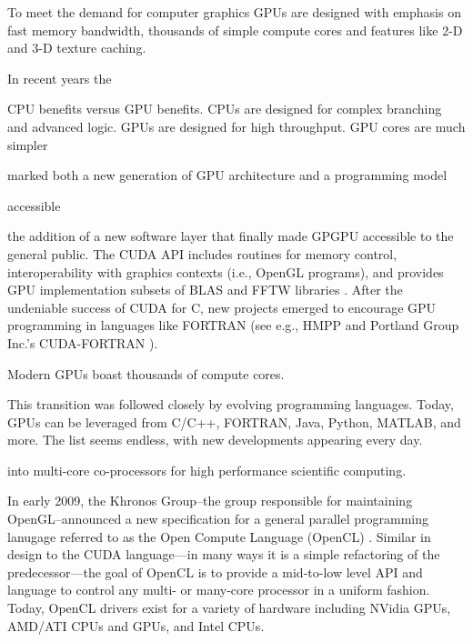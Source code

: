 \documentclass{report}
\begin{document}
To meet the demand for computer graphics GPUs are designed with emphasis on fast memory bandwidth, thousands of simple compute cores and features like 2-D and 3-D texture caching. 



In recent years the 

CPU benefits versus GPU benefits. CPUs are designed for complex branching and advanced logic. GPUs are designed for high throughput. GPU cores are much simpler 



 

marked both a 
new generation of GPU architecture and a programming model 

accessible 


the addition of a new software layer that finally made GPGPU accessible to the general public. The CUDA API includes routines for memory control, interoperability with graphics contexts (i.e., 
OpenGL programs), and provides GPU implementation subsets of BLAS and FFTW libraries \cite{CudaGuide2011}. After the undeniable success of CUDA for C, new projects emerged to encourage GPU programming in languages like FORTRAN (see e.g., HMPP \cite{HMPP2009} and Portland Group Inc.'s CUDA-FORTRAN \cite{CudaFortran2009}). 


Modern GPUs boast thousands of compute cores. 


This transition was 
followed closely by evolving programming languages. Today, GPUs can be leveraged from C/C++, FORTRAN, Java, Python, MATLAB, and more. The list seems endless, with new developments appearing every day. 

 into multi-core co-processors for high performance scientific computing.

In early 2009, the Khronos Group--the group responsible for maintaining OpenGL--announced a new specification for a general 
parallel programming lanugage referred to as the Open Compute Language (OpenCL) \cite{OpenCL2009}. Similar in design to the CUDA language---in many ways it is a simple refactoring of the predecessor---the goal of OpenCL is to provide a mid-to-low level API and language to control any multi- or many-core processor in a uniform fashion. Today, OpenCL drivers exist for a variety of hardware including NVidia GPUs, AMD/ATI CPUs and GPUs, and Intel CPUs. 
\end{document}
